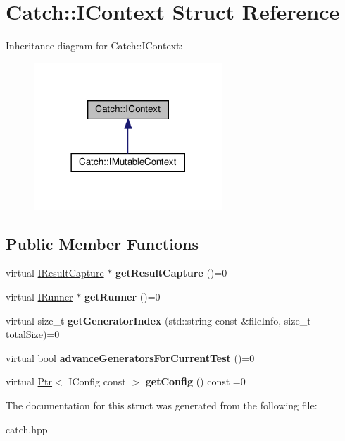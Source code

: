 \hypertarget{structCatch_1_1IContext}{}\section{Catch\+:\+:I\+Context Struct Reference}
\label{structCatch_1_1IContext}


Inheritance diagram for Catch\+:\+:I\+Context\+:\nopagebreak
\begin{figure}[H]
\begin{center}
\leavevmode
\includegraphics[width=201pt]{structCatch_1_1IContext__inherit__graph}
\end{center}
\end{figure}
\subsection*{Public Member Functions}
\begin{DoxyCompactItemize}
\item 
\mbox{\label{structCatch_1_1IContext_a684e4ae71d1fdf3060c352ecde1d122f}} 
virtual \hyperlink{structCatch_1_1IResultCapture}{I\+Result\+Capture} $\ast$ {\bfseries get\+Result\+Capture} ()=0
\item 
\mbox{\label{structCatch_1_1IContext_af088415dde18d039ed5a2f95b02767c6}} 
virtual \hyperlink{structCatch_1_1IRunner}{I\+Runner} $\ast$ {\bfseries get\+Runner} ()=0
\item 
\mbox{\label{structCatch_1_1IContext_a43e07088db43299ba129fbe6d3106e95}} 
virtual size\+\_\+t {\bfseries get\+Generator\+Index} (std\+::string const \&file\+Info, size\+\_\+t total\+Size)=0
\item 
\mbox{\label{structCatch_1_1IContext_a806f7c4ed24d51adae90418e661b24b7}} 
virtual bool {\bfseries advance\+Generators\+For\+Current\+Test} ()=0
\item 
\mbox{\label{structCatch_1_1IContext_aee81c415899262e096ad8d6f686fa365}} 
virtual \hyperlink{classCatch_1_1Ptr}{Ptr}$<$ I\+Config const  $>$ {\bfseries get\+Config} () const =0
\end{DoxyCompactItemize}


The documentation for this struct was generated from the following file\+:\begin{DoxyCompactItemize}
\item 
catch.\+hpp\end{DoxyCompactItemize}
